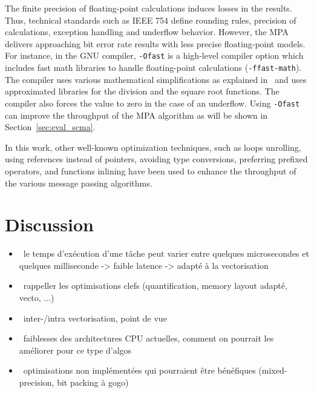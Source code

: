 The finite precision of floating-point calculations induces losses in the
results. Thus, technical standards such as IEEE 754 define rounding rules,
precision of calculations, exception handling and underflow behavior. However,
the MPA delivers approaching bit error rate results with less precise
floating-point models. For instance, in the GNU compiler, \verb|-Ofast| is a
high-level compiler option which includes fast math libraries to handle
floating-point calculations (\verb|-ffast-math|). The compiler uses various
mathematical simplifications as explained in~\cite{Gccfp2018} and uses
approximated libraries for the division and the square root functions. The
compiler also forces the value to zero in the case of an underflow. Using
\verb|-Ofast| can improve the throughput of the MPA algorithm as will be shown
in Section~\ref{sec:eval_scma}.

In this work, other well-known optimization techniques, such as loops unrolling,
using references instead of pointers, avoiding type conversions, preferring
prefixed operators, and functions inlining have been used to enhance the
throughput of the various message passing algorithms.

\section{Discussion}

\begin{itemize}
  \item \xmark~le temps d’exécution d’une tâche peut varier entre quelques
    microsecondes et quelques milliseconde -> faible latence -> adapté à la
    vectorisation
  \item \xmark~rappeller les optimisations clefs (quantification, memory layout
    adapté, vecto, ...)
  \item \xmark~inter-/intra vectorisation, point de vue
  \item \xmark~faiblesses des architectures CPU actuelles, comment on pourrait
    les améliorer pour ce type d'algos
  \item \xmark~optimisations non implémentées qui pourraient être bénéfiques
    (mixed-precision, bit packing à gogo)
\end{itemize}